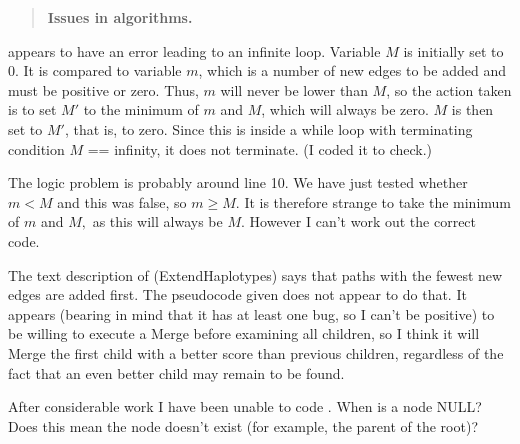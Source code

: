 \reply{
}

\begin{quote} %
\textbf{Issues in algorithms.}
\end{quote}

\begin{point}{}
 appears to have an error leading to an infinite
loop. Variable $M$ is initially set to 0. It is compared to variable $m$,
which is a number of new edges to be added and must be positive or zero.
Thus, $m$ will never be lower than $M$, so the action taken is to set $M'$ to
the minimum of $m$ and $M$, which will always be zero. $M$ is then set to
$M'$, that is, to zero. Since this is inside a while loop with terminating
condition $M$ == infinity, it does not terminate. (I coded it to check.)

The logic problem is probably around line 10. We have just tested
whether $m < M$ and this was false, so $m \ge M$. It is therefore
strange to take the minimum of $m$ and $M,$ as this will always be
$M$. However I can't work out the correct code.
\end{point}


\begin{point}{}
The text description of  (ExtendHaplotypes) says that
paths with the fewest new edges are added first. The pseudocode
given does not appear to do that. It appears (bearing in mind that
it has at least one bug, so I can't be positive) to be willing to
execute a Merge before examining all children, so I think it will
Merge the first child with a better score than previous children,
regardless of the fact that an even better child may remain to be
found.
\end{point}


\begin{point}{}
After considerable work I have been unable to code .
When is a node NULL? Does this mean the node doesn't exist (for
example, the parent of the root)?
\end{point}

